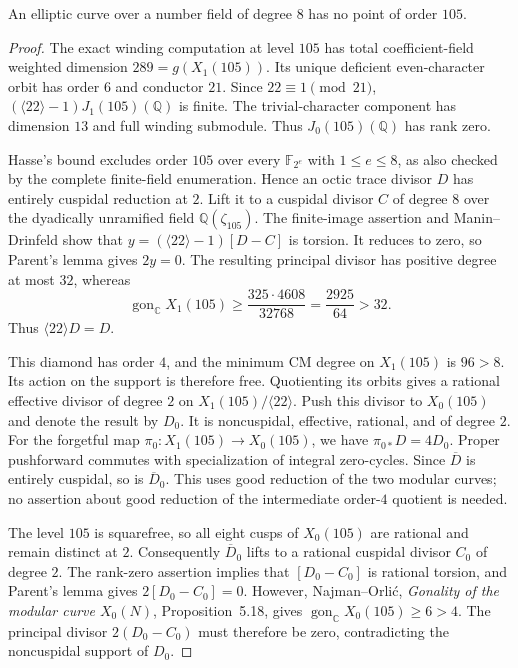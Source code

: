 \begin{proposition}\label{prop:octic-no105}
An elliptic curve over a number field of degree $8$ has no point of
order $105$.
\end{proposition}
\begin{proof}
The exact winding computation at level $105$ has total
coefficient-field weighted dimension $289=g(X_1(105))$.
Its unique deficient even-character orbit has order $6$ and
conductor $21$. Since $22\equiv1\pmod{21}$,
$(\langle22\rangle-1)J_1(105)(\mathbb Q)$ is finite.
The trivial-character component has dimension $13$ and full
winding submodule. Thus $J_0(105)(\mathbb Q)$ has rank zero.

Hasse's bound excludes order $105$ over every $\mathbb F_{2^e}$
with $1\leq e\leq8$, as also checked by the complete finite-field
enumeration. Hence an octic trace divisor $D$ has entirely
cuspidal reduction at $2$.
Lift it to a cuspidal divisor $C$ of degree $8$ over
the dyadically unramified field $\mathbb Q(\zeta_{105})$.
The finite-image assertion and Manin--Drinfeld show that
$y=(\langle22\rangle-1)[D-C]$ is torsion.
It reduces to zero, so Parent's lemma gives $2y=0$.
The resulting principal divisor has positive degree at most $32$,
whereas
\[
 \operatorname{gon}_{\mathbb C}X_1(105)
 \geq\frac{325\cdot4608}{32768}
 =\frac{2925}{64}>32.
\]
Thus $\langle22\rangle D=D$.

This diamond has order $4$, and the minimum CM degree on
$X_1(105)$ is $96>8$. Its action on the support is therefore
free. Quotienting its orbits gives a rational effective divisor
of degree $2$ on $X_1(105)/\langle22\rangle$.
Push this divisor to $X_0(105)$ and denote the result by $D_0$.
It is noncuspidal, effective, rational, and of degree $2$.
For the forgetful map $\pi_0:X_1(105)\longrightarrow X_0(105)$,
we have $\pi_{0*}D=4D_0$.
Proper pushforward commutes with specialization of integral
zero-cycles. Since $\overline D$ is entirely cuspidal,
so is $\overline D_0$.
This uses good reduction of the two modular curves; no assertion
about good reduction of the intermediate order-$4$ quotient is needed.

The level $105$ is squarefree, so all eight cusps of $X_0(105)$
are rational and remain distinct at $2$.
Consequently $\overline D_0$ lifts to a rational cuspidal divisor
$C_0$ of degree $2$.
The rank-zero assertion implies that $[D_0-C_0]$ is rational
torsion, and Parent's lemma gives $2[D_0-C_0]=0$.
However, Najman--Orli\'c, \emph{Gonality of the modular curve
$X_0(N)$}, Proposition~5.18, gives
$\operatorname{gon}_{\mathbb C}X_0(105)\geq6>4$.
The principal divisor $2(D_0-C_0)$ must therefore be zero,
contradicting the noncuspidal support of $D_0$.
\end{proof}

